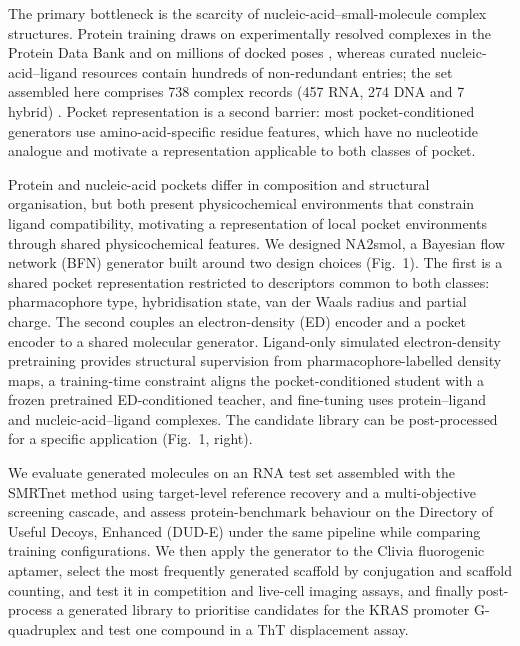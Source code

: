 \documentclass[pdflatex,sn-mathphys-num]{sn-jnl}
\theoremstyle{thmstyleone}
\theoremstyle{thmstyletwo}
\theoremstyle{thmstylethree}
\begin{document}
The primary bottleneck is the scarcity of nucleic-acid--small-molecule complex structures. Protein training draws on experimentally resolved complexes in the Protein Data Bank \cite{berman2000pdb} and on millions of docked poses \cite{francoeur2020crossdocked}, whereas curated nucleic-acid--ligand resources contain hundreds of non-redundant entries; the set assembled here comprises 738 complex records (457 RNA, 274 DNA and 7 hybrid) \cite{hariboss2022,rnamigos2025,smrtnet2026,g4ldb2025}. Pocket representation is a second barrier: most pocket-conditioned generators use amino-acid-specific residue features, which have no nucleotide analogue and motivate a representation applicable to both classes of pocket.

Protein and nucleic-acid pockets differ in composition and structural organisation, but both present physicochemical environments that constrain ligand compatibility, motivating a representation of local pocket environments through shared physicochemical features. We designed NA2smol, a Bayesian flow network (BFN) generator \cite{graves2023bfn} built around two design choices (Fig.~1). The first is a shared pocket representation restricted to descriptors common to both classes: pharmacophore type, hybridisation state, van der Waals radius and partial charge. The second couples an electron-density (ED) encoder and a pocket encoder to a shared molecular generator. Ligand-only simulated electron-density pretraining \cite{ed2mol2025} provides structural supervision from pharmacophore-labelled density maps, a training-time constraint aligns the pocket-conditioned student with a frozen pretrained ED-conditioned teacher, and fine-tuning uses protein--ligand and nucleic-acid--ligand complexes. The candidate library can be post-processed for a specific application (Fig.~1, right).

We evaluate generated molecules on an RNA test set assembled with the SMRTnet method \cite{smrtnet2026} using target-level reference recovery and a multi-objective screening cascade, and assess protein-benchmark behaviour on the Directory of Useful Decoys, Enhanced (DUD-E) \cite{dude2012} under the same pipeline while comparing training configurations. We then apply the generator to the Clivia fluorogenic aptamer, select the most frequently generated scaffold by conjugation and scaffold counting, and test it in competition and live-cell imaging assays, and finally post-process a generated library to prioritise candidates for the KRAS promoter G-quadruplex and test one compound in a ThT displacement assay.
\end{document}
